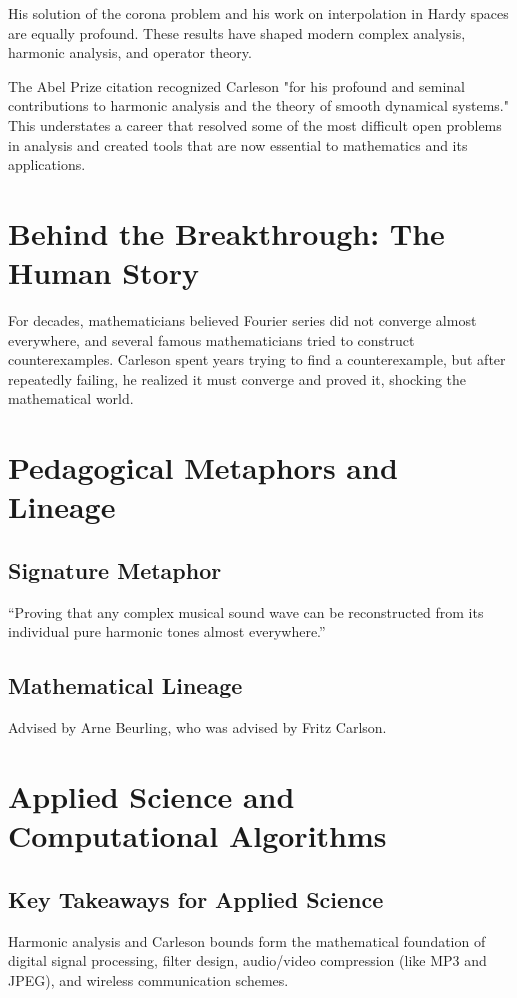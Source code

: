 His solution of the corona problem and his work on interpolation in Hardy spaces are equally profound. These results have shaped modern complex analysis, harmonic analysis, and operator theory.

The Abel Prize citation recognized Carleson "for his profound and seminal contributions to harmonic analysis and the theory of smooth dynamical systems." This understates a career that resolved some of the most difficult open problems in analysis and created tools that are now essential to mathematics and its applications.


\section{Behind the Breakthrough: The Human Story}
For decades, mathematicians believed Fourier series did not converge almost everywhere, and several famous mathematicians tried to construct counterexamples. Carleson spent years trying to find a counterexample, but after repeatedly failing, he realized it must converge and proved it, shocking the mathematical world.

\section{Pedagogical Metaphors and Lineage}
\subsection{Signature Metaphor}
``Proving that any complex musical sound wave can be reconstructed from its individual pure harmonic tones almost everywhere.''

\subsection{Mathematical Lineage}
Advised by Arne Beurling, who was advised by Fritz Carlson.

\section{Applied Science and Computational Algorithms}
\subsection{Key Takeaways for Applied Science}
Harmonic analysis and Carleson bounds form the mathematical foundation of digital signal processing, filter design, audio/video compression (like MP3 and JPEG), and wireless communication schemes.

